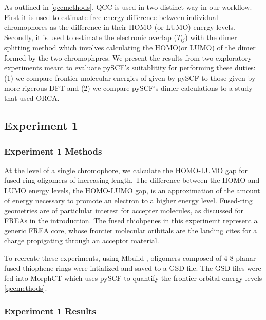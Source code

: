 \label{qccresults}

As outlined in \autoref{qccmethods}, QCC is used in two distinct way in our workflow. 
First it is used to estimate free energy
difference between individual chromophores as the difference in their HOMO (or LUMO) energy levels.
Secondly, it is used to estimate the electronic overlap ($T_{ij}$) with the dimer splitting method which involves
calculating the HOMO(or LUMO) of the dimer formed by the two chromophpres. We present the results from two
exploratory experiments meant to evaluate pySCF's suitablitity for performing these duties:
 (1) we compare frontier molecular energies of given by pySCF to those
given by more rigerous DFT and (2) we compare pySCF's dimer calculations to a study that used ORCA.  


\subsection{Experiment 1}

\subsubsection{Experiment 1 Methods}

At the level of a single chromophore, we calculate the HOMO-LUMO gap for fused-ring
oligomers of increasing length. 
The difference between the HOMO and LUMO energy levels, the HOMO-LUMO gap, is an approximation of the amount
of energy necessary to promote an electron to a higher energy level.  
Fused-ring geometries are of particlular interest for accepter
molecules, as discussed for FREAs in the introduction. 
The fused thiohpenes in this experinemt represent a generic FREA core, whose frontier molecular oribitals are
the landing cites for a charge propigating through an acceptor material. 

To recreate these experiments, using Mbuild \cite{Klein2016}, oligomers composed of 4-8 planar fused thiophene rings
were intialized and saved to a GSD file. The GSD files were fed into MorphCT which uses pySCF to quantify the
frontier orbital energy levels \autoref{qccmethods}.

\subsubsection{Experiment 1 Results}

